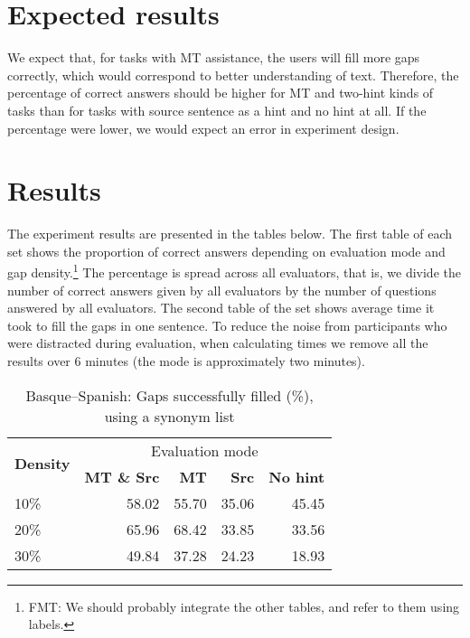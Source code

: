 \documentclass[11pt]{article}
\begin{document}
\section{Expected results}

We expect that, for tasks with MT assistance, the users will fill more gaps correctly,
which would correspond to better understanding of text. Therefore, the percentage of
correct answers should be higher for MT and two-hint kinds of tasks than for tasks with
source sentence as a hint and no hint at all. If the percentage were lower, we would
expect an error in experiment design.

\section{Results}

The experiment results are presented in the tables below. The first table of each set shows
the proportion of correct answers depending on evaluation mode and gap density.\footnote{FMT: We should probably integrate the other tables, and refer to them using labels.} The
percentage is spread across all evaluators, that is, we divide the number of correct
answers given by all evaluators by the number of questions answered by all evaluators.
The second table of the set shows average time it took to fill the gaps in one sentence. To
reduce the noise from participants who were distracted during evaluation, when
calculating times we remove all the results over 6 minutes (the mode is approximately
two minutes).

\begin{table}
  \begin{tabular}{|l|r|r|r|r|}
    \hline
    \multirow{2}{*}{\textbf{Density}} & \multicolumn{4}{|c|}{Evaluation mode} \\\cline{2-5}
                                            & \textbf{MT \& Src} & \textbf{MT} & \textbf{Src} & \textbf{No hint} \\
    10\%                                    &   58.02            & 55.70       & 35.06        & 45.45        \\
    20\%                                    &   65.96            & 68.42       & 33.85        & 33.56        \\
    30\%                                    &   49.84            & 37.28       & 24.23        & 18.93        \\
    \hline
  \end{tabular}
  \caption{Basque--Spanish: Gaps successfully filled (\%), using a synonym list}
  \label{table:res-eus-spa}
\end{table}
\end{document}
